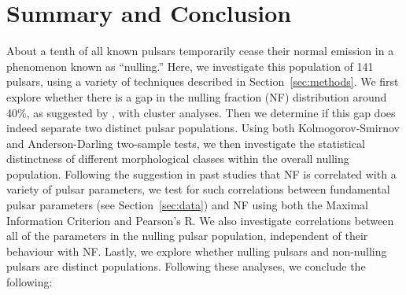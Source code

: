 \documentclass[fleqn,usenatbib]{mnras}
\begin{document}
\newpage

\section{Summary and Conclusion}\label{sec:conclusion}

About a tenth of all known pulsars temporarily cease their normal emission in a phenomenon known as ``nulling.'' Here, we investigate this population of 141 pulsars, using a variety of techniques described in Section~\ref{sec:methods}. We first explore whether there is a gap in the nulling fraction (NF) distribution around 40\%, as suggested by \citet{Konar2019}, with cluster analyses. Then we determine if this gap does indeed separate two distinct pulsar populations. Using both Kolmogorov-Smirnov and Anderson-Darling two-sample tests, we then investigate the statistical distinctness of different morphological classes within the overall nulling population. Following the suggestion in past studies that NF is correlated with a variety of pulsar parameters, we test for such correlations between fundamental pulsar parameters (see Section~\ref{sec:data}) and NF using both the Maximal Information Criterion and Pearson's R. We also investigate correlations between all of the parameters in the nulling pulsar population, independent of their behaviour with NF. Lastly, we explore whether nulling pulsars and non-nulling pulsars are distinct populations. Following these analyses, we conclude the following:
\end{document}
